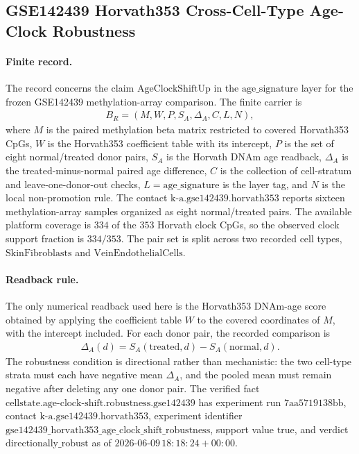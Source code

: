 \subsection{GSE142439 Horvath353 Cross-Cell-Type Age-Clock Robustness}\label{subsec:bioreality-age-clock-shift-gse142439-cross-cell-type-robustness}

\paragraph{Finite record.}
The record concerns the claim $\mathrm{AgeClockShiftUp}$ in the $\mathrm{age\_signature}$ layer for the frozen GSE142439 methylation-array comparison. The finite carrier is
$$
\begin{aligned}
B_R=(M,W,P,S_A,\Delta_A,C,L,N),
\end{aligned}
$$
where $M$ is the paired methylation beta matrix restricted to covered Horvath353 CpGs, $W$ is the Horvath353 coefficient table with its intercept, $P$ is the set of eight normal/treated donor pairs, $S_A$ is the Horvath DNAm age readback, $\Delta_A$ is the treated-minus-normal paired age difference, $C$ is the collection of cell-stratum and leave-one-donor-out checks, $L=\mathrm{age\_signature}$ is the layer tag, and $N$ is the local non-promotion rule. The contact $\mathrm{k\mbox{-}a.gse142439.horvath353}$ reports sixteen methylation-array samples organized as eight normal/treated pairs. The available platform coverage is $334$ of the $353$ Horvath clock CpGs, so the observed clock support fraction is $334/353$. The pair set is split across two recorded cell types, $\mathrm{SkinFibroblasts}$ and $\mathrm{VeinEndothelialCells}$.

\paragraph{Readback rule.}
The only numerical readback used here is the Horvath353 DNAm-age score obtained by applying the coefficient table $W$ to the covered coordinates of $M$, with the intercept included. For each donor pair, the recorded comparison is
$$
\begin{aligned}
\Delta_A(d)=S_A(\mathrm{treated},d)-S_A(\mathrm{normal},d).
\end{aligned}
$$
The robustness condition is directional rather than mechanistic: the two cell-type strata must each have negative mean $\Delta_A$, and the pooled mean must remain negative after deleting any one donor pair. The verified fact $\mathrm{cellstate.age\mbox{-}clock\mbox{-}shift.robustness.gse142439}$ has experiment run $\mathrm{7aa5719138bb}$, contact $\mathrm{k\mbox{-}a.gse142439.horvath353}$, experiment identifier $\mathrm{gse142439\_horvath353\_age\_clock\_shift\_robustness}$, support value $\mathrm{true}$, and verdict $\mathrm{directionally\_robust}$ as of $2026\mbox{-}06\mbox{-}09\,18{:}18{:}24+00{:}00$.

